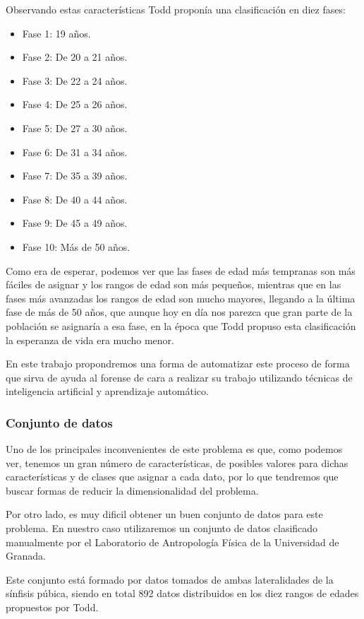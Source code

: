 Observando estas características Todd proponía una clasificación en diez fases:

\begin{itemize}
	\item Fase 1: 19 años.
	\item Fase 2: De 20 a 21 años.
	\item Fase 3: De 22 a 24 años.
	\item Fase 4: De 25 a 26 años.
	\item Fase 5: De 27 a 30 años.
	\item Fase 6: De 31 a 34 años.
	\item Fase 7: De 35 a 39 años.
	\item Fase 8: De 40 a 44 años.
	\item Fase 9: De 45 a 49 años.
	\item Fase 10: Más de 50 años.
\end{itemize}

Como era de esperar, podemos ver que las fases de edad más tempranas son más fáciles de asignar y los rangos de edad son más pequeños, mientras que en las fases más avanzadas los rangos de edad son mucho mayores, llegando a la última fase de más de 50 años, que aunque hoy en día nos parezca que gran parte de la población se asignaría a esa fase, en la época que Todd propuso esta clasificación la esperanza de vida era mucho menor.

En este trabajo propondremos una forma de automatizar este proceso de forma que sirva de ayuda al forense de cara a realizar su trabajo utilizando técnicas de inteligencia artificial y aprendizaje automático.

\subsubsection{Conjunto de datos}

Uno de los principales inconvenientes de este problema es que, como podemos ver, tenemos un gran número de características, de posibles valores para dichas características y de clases que asignar a cada dato, por lo que tendremos que buscar formas de reducir la dimensionalidad del problema.

Por otro lado, es muy dificil obtener un buen conjunto de datos para este problema. En nuestro caso utilizaremos un conjunto de datos clasificado manualmente por el Laboratorio de Antropología Física de la Universidad de Granada\cite{laboratorioForenseUGR}.

Este conjunto está formado por datos tomados de ambas lateralidades de la sínfisis púbica, siendo en total 892 datos distribuidos en los diez rangos de edades propuestos por Todd.

